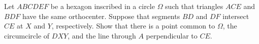 Let $ABCDEF$ be a hexagon inscribed in a circle $\Omega$ such that triangles $ACE$ and $BDF$ have the same orthocenter. Suppose that segments $BD$ and $DF$ intersect $CE$ at $X$ and $Y$, respectively. Show that there is a point common to $\Omega$, the circumcircle of $DXY$, and the line through $A$ perpendicular to $CE$.